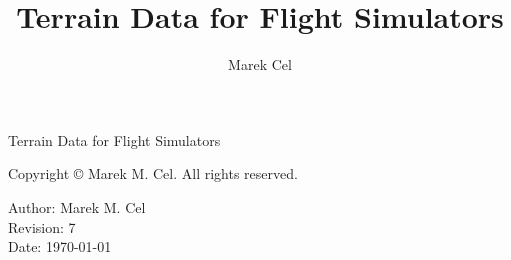 \documentclass[12pt,a4paper]{report}
\title{Terrain Data for Flight Simulators}
\author{Marek Cel}
\date{}
\begin{document}
  
  \begin{titlepage}
    \centering
    {\huge Terrain Data for Flight Simulators\par}
  \end{titlepage}
  

  \noindent Copyright \copyright{} \the\year{} Marek M. Cel. All rights reserved.

  \noindent Author: Marek M. Cel \\
  Revision: 7 \\
  Date: \today

  
  
  {
    \clearpage
    \setlength{\parskip}{0em}
    \tableofcontents
  }

  
  \clearpage
   
  
  
\end{document}
